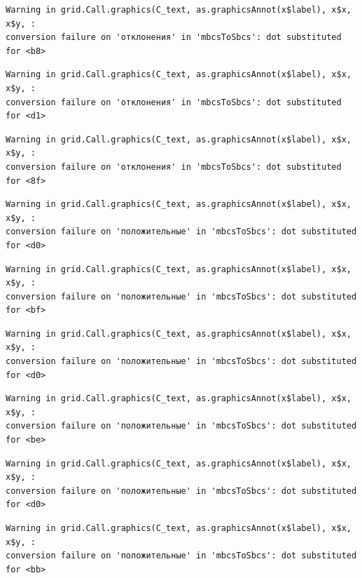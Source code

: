 \documentclass[
  letterpaper,
  DIV=11,
  numbers=noendperiod]{scrreprt}
\theoremstyle{definition}
\theoremstyle{remark}
\begin{document}
\begin{verbatim}
Warning in grid.Call.graphics(C_text, as.graphicsAnnot(x$label), x$x, x$y, :
conversion failure on 'отклонения' in 'mbcsToSbcs': dot substituted for <b8>
\end{verbatim}

\begin{verbatim}
Warning in grid.Call.graphics(C_text, as.graphicsAnnot(x$label), x$x, x$y, :
conversion failure on 'отклонения' in 'mbcsToSbcs': dot substituted for <d1>
\end{verbatim}

\begin{verbatim}
Warning in grid.Call.graphics(C_text, as.graphicsAnnot(x$label), x$x, x$y, :
conversion failure on 'отклонения' in 'mbcsToSbcs': dot substituted for <8f>
\end{verbatim}

\begin{verbatim}
Warning in grid.Call.graphics(C_text, as.graphicsAnnot(x$label), x$x, x$y, :
conversion failure on 'положительные' in 'mbcsToSbcs': dot substituted for <d0>
\end{verbatim}

\begin{verbatim}
Warning in grid.Call.graphics(C_text, as.graphicsAnnot(x$label), x$x, x$y, :
conversion failure on 'положительные' in 'mbcsToSbcs': dot substituted for <bf>
\end{verbatim}

\begin{verbatim}
Warning in grid.Call.graphics(C_text, as.graphicsAnnot(x$label), x$x, x$y, :
conversion failure on 'положительные' in 'mbcsToSbcs': dot substituted for <d0>
\end{verbatim}

\begin{verbatim}
Warning in grid.Call.graphics(C_text, as.graphicsAnnot(x$label), x$x, x$y, :
conversion failure on 'положительные' in 'mbcsToSbcs': dot substituted for <be>
\end{verbatim}

\begin{verbatim}
Warning in grid.Call.graphics(C_text, as.graphicsAnnot(x$label), x$x, x$y, :
conversion failure on 'положительные' in 'mbcsToSbcs': dot substituted for <d0>
\end{verbatim}

\begin{verbatim}
Warning in grid.Call.graphics(C_text, as.graphicsAnnot(x$label), x$x, x$y, :
conversion failure on 'положительные' in 'mbcsToSbcs': dot substituted for <bb>
\end{verbatim}
\end{document}
